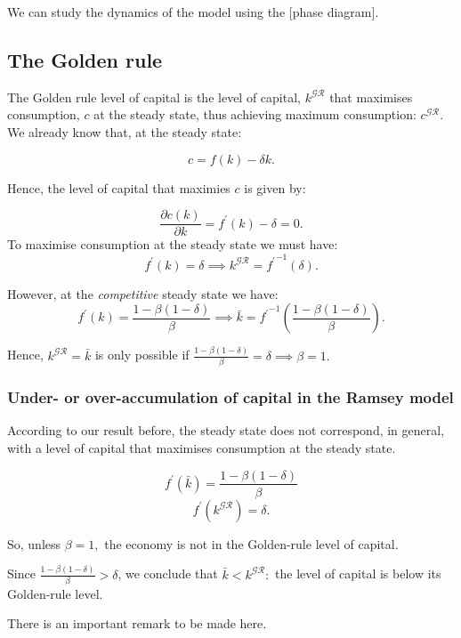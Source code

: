\documentclass[11pt,a4paper,english]{article}
\begin{document}
We can study the dynamics of the model using the {[}phase diagram{]}.

\hypertarget{golden-rule}{%
\subsection{The Golden rule}\label{golden-rule}}

The Golden rule level of capital is the level of capital,
\(k^{\mathcal{GR}}\) that maximises consumption, \(c\) at the steady
state, thus achieving maximum consumption: \(c^{\mathcal{GR}}.\) We
already know that, at the steady state:

\[c = f(k) -\delta k.\]

Hence, the level of capital that maximies \(c\) is given by:

\[\frac{\partial c(k)}{\partial k} = f^{\prime}(k) - \delta = 0.\] To
maximise consumption at the steady state we must have:
\[f^{\prime}(k) = \delta \implies k^{\mathcal{GR}} = {f^{\prime}}^{-1}(\delta).\]

However, at the \emph{competitive} steady state we have:
\[f^{\prime}(k) = \frac{1-\beta (1 - \delta)}{\beta} \implies \bar{k} = {f^{\prime}}^{-1}\left(\frac{1-\beta (1 - \delta)}{\beta}\right). \]

Hence, \(k^{\mathcal{GR}} = \bar{k}\) is only possible if
\(\frac{1-\beta (1 - \delta)}{\beta} = \delta \implies \beta = 1.\)

\hypertarget{under--or-over-accumulation-of-capital-in-the-ramsey-model}{%
\subsubsection{Under- or over-accumulation of capital in the Ramsey
model}\label{under--or-over-accumulation-of-capital-in-the-ramsey-model}}

According to our result before, the steady state does not correspond, in
general, with a level of capital that maximises consumption at the
steady state.

\[f^{\prime}(\bar{k}) = \frac{1-\beta (1 - \delta)}{\beta}\]
\[f^{\prime}(k^{\mathcal{GR}}) = \delta.\]

So, unless \(\beta = 1,\) the economy is not in the Golden-rule level of
capital.

Since \(\frac{1-\beta (1 - \delta)}{\beta} > \delta\), we conclude that
\(\bar{k} < k^{\mathcal{GR}}:\) the level of capital is below its
Golden-rule level.

There is an important remark to be made here.
\end{document}

